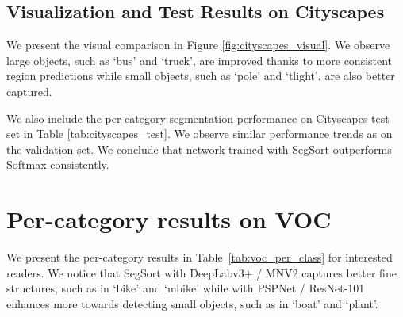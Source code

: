 \documentclass[10pt,twocolumn,letterpaper]{article}
\begin{document}
\subsection{Visualization and Test Results on Cityscapes}

We present the visual comparison in Figure \ref{fig:cityscapes_visual}. We observe large objects, such as `bus' and `truck', are improved thanks to more consistent region predictions while small objects, such as `pole' and `tlight', are also better captured.

We also include the per-category segmentation performance on Cityscapes test set in Table \ref{tab:cityscapes_test}. We observe similar performance trends as on the validation set. We conclude that network trained with SegSort outperforms Softmax consistently.




\begin{table*}
  \centering
    \vspace{0.5pt}
    \caption{Per-class results on Cityscapes test set. We conclude that network trained with SegSort outperforms Softmax consistently.}
    \label{tab:cityscapes_test}
\end{table*}



\section{Per-category results on VOC}

We present the per-category results in Table~\ref{tab:voc_per_class} for interested readers. We notice that SegSort with DeepLabv3+ / MNV2 captures better fine structures, such as in ‘bike’ and ‘mbike’ while with PSPNet / ResNet-101 enhances more towards detecting small objects, such as in ‘boat’ and ‘plant’.
\end{document}
